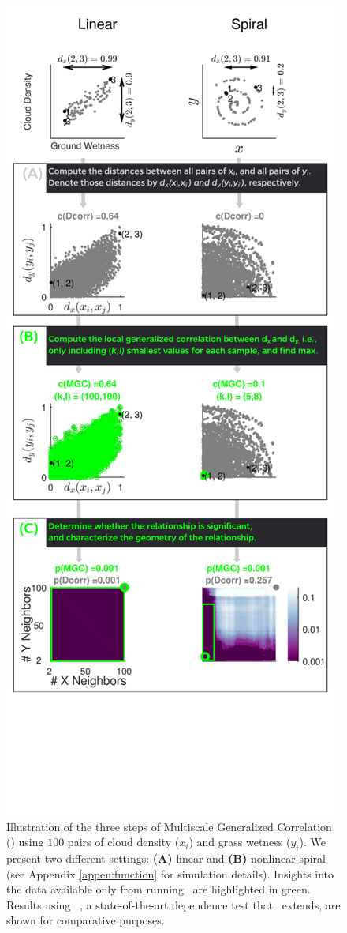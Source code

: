 \documentclass[11pt]{article}
\begin{document}
\begin{figure}
\includegraphics[width=0.54\linewidth]{Figures/Fig1Allb.pdf}
\caption{
Illustration of the three steps of Multiscale Generalized Correlation (\Mgc)  using  $100$ pairs of cloud density ($x_i$) and grass wetness ($y_i$). 
We present two different settings: \textbf{(A)} linear  and \textbf{(B)} nonlinear spiral  (see Appendix \ref{appen:function} for simulation details). 
Insights into the data available only from running \Mgc~are highlighted in {\color{green}green.}  Results using \Dcorr~\cite{SzekelyRizzo2009}, a state-of-the-art dependence test that \Mgc~extends, are shown for comparative purposes. 
}
\end{figure}
\end{document}
